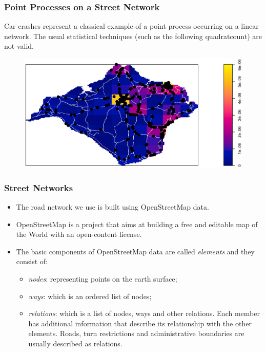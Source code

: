 \documentclass[c,10pt,pdftex]{beamer}
\begin{document}
\begin{frame}
\frametitle{Point Processes on a Street Network}
\vspace{-0.25cm}
Car crashes represent a classical example of a \alert{point process occurring on a linear network}. The usual statistical techniques (such as the following quadratcount) are not valid. 
\vspace{-0.5cm}
\begin{figure}
	\centering
	\includegraphics[width=\linewidth]{images/quadratcount2}
\end{figure}
\end{frame}

\begin{frame}
\frametitle{Street Networks}
\vspace{-0.75cm}
\begin{itemize}
  \setlength\itemsep{1em}
  \item The road network we use is built using \alert{OpenStreetMap} data. 
  \item OpenStreetMap is a project that aims at building a free and editable map of the World with an open-content license. 
  \item The basic components of OpenStreetMap data are called \textit{elements} and they consist of: 
  \begin{itemize}
    \setlength\itemsep{0.25em}
    \item \textit{nodes}: representing points on the earth surface; 
    \item \textit{ways}: which is an ordered list of nodes; 
    \item \textit{relations}: which is a list of nodes, ways and other relations. Each member has additional information that describe its relationship with the other elements. Roads, turn restrictions and administrative boundaries are usually described as relations.
  \end{itemize}
\end{itemize}
\end{frame}
\end{document}
